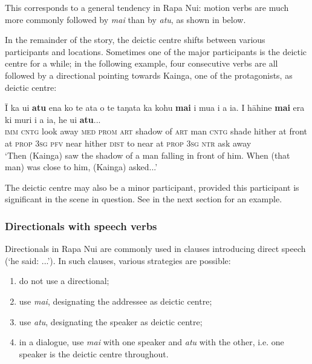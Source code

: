 This corresponds to a general tendency in Rapa Nui: motion verbs are much more commonly followed by \textit{mai} than by \textit{atu}, as shown in  below.

In the remainder of the story, the deictic centre shifts between various participants and locations. Sometimes one of the major participants is the deictic centre for a while; in the following example, four consecutive verbs are all followed by a directional pointing towards Kainga, one of the protagonists, as deictic centre:

\ea\label{ex:7.139}
\gll {\ꞌ}Ī ka u{\ꞌ}i \textbf{atu} ena ko te {\ꞌ}ata o te taŋata ka kohu \textbf{mai}  {\ꞌ}i mu{\ꞌ}a i a ia. I hāhine \textbf{mai} era ki muri i a ia, he {\ꞌ}ui \textbf{atu}...\\
\textsc{imm} \textsc{cntg} look away \textsc{med} \textsc{prom} \textsc{art} shadow of \textsc{art} man \textsc{cntg} shade hither  at front at \textsc{prop} \textsc{3sg} \textsc{pfv} near hither \textsc{dist} to near at \textsc{prop} \textsc{3sg} \textsc{ntr} ask away\\

\glt
‘Then (Kainga) saw the shadow of a man falling in front of him. When (that man) was close to him, (Kainga) asked...’ \textstyleExampleref{[R304.095–096]}
\z

The deictic centre may also be a minor participant, provided this participant is significant in the scene in question. See  in the next section for an example. 

\subsubsection[Directionals with speech verbs]{Directionals with speech verbs}\label{sec:7.5.1.3}
Directionals in Rapa Nui are commonly used in clauses introducing direct speech (‘he said: ...’). In such clauses, various strategies are possible:

\begin{enumerate}
\item 
do not use a directional;

\item 
use \textit{mai}, designating the addressee as deictic centre;

\item 
use \textit{atu}, designating the speaker as deictic centre;

\item 
in a dialogue, use \textit{mai} with one speaker and \textit{atu} with the other, i.e. one speaker is the deictic centre throughout.

\end{enumerate}

